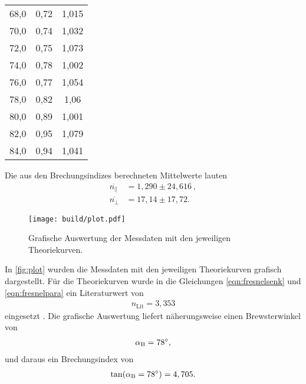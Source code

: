 \begin{table}[H]
\begin{tabular}{c c c}
        68,0  &  0,72  &  1,015  \\
        70,0  &  0,74  &  1,032  \\
        72,0  &  0,75  &  1,073  \\
        74,0  &  0,78  &  1,002  \\
        76,0  &  0,77  &  1,054  \\
        78,0  &  0,82  &  1,06  \\
        80,0  &  0,89  &  1,001  \\
        82,0  &  0,95  &  1,079  \\
        84,0  &  0,94  &  1,041  \\
        \bottomrule
    \end{tabular}
\end{table}


\noindent
Die aus den Brechungsindizes berechneten Mittelwerte lauten
\begin{align*}
    \overline{n_\parallel} &= 1,290 \pm 24,616 \ , \\
    \overline{n_\perp} &= 17,14 \pm 17,72.
\end{align*}


\begin{figure}[H]
    \centering
    \texttt{[image: build/plot.pdf]}
    \caption{Grafische Auswertung der Messdaten mit den jeweiligen Theoriekurven.}
    \label{fig:plot}
\end{figure}

\noindent
In \autoref{fig:plot} wurden die Messdaten mit den jeweiligen Theoriekurven grafisch dargestellt. Für die Theoriekurven wurde in die Gleichungen \eqref{eqn:fresnelsenk} und \eqref{eqn:fresnelpara}
ein Literaturwert von
\begin{align*}
    n_{\text{Lit}} = 3,353
\end{align*}
eingesetzt \cite{BrechSilizium}. Die grafische Auswertung liefert näherungsweise einen Brewsterwinkel von  
\begin{align*}
    \alpha_{\text B} = \SI{78}{\degree},
\end{align*}
und daraus ein Brechungsindex von 
\begin{align*}
    \tan(\alpha_{\text B} = \SI{78}{\degree}) = 4,705.
\end{align*}